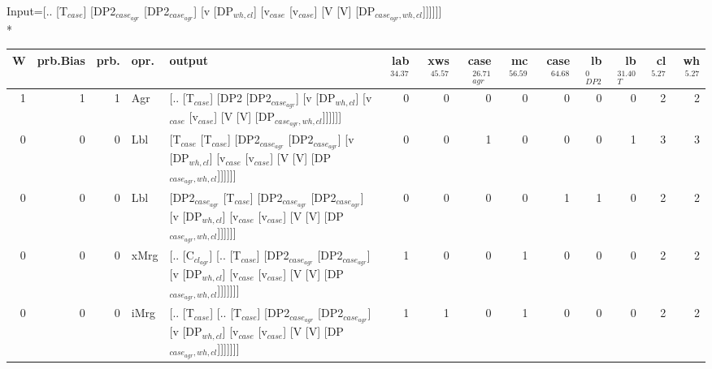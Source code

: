 \begingroup\scriptsize Input=[.. [T$_{case}$] [DP2$_{case_{agr}}$ [DP2$_{case_{agr}}$] [v [DP$_{wh,cl}$] [v$_{case}$ [v$_{case}$] [V [V] [DP$_{case_{agr},wh,cl}$]]]]]]\\*
\begin{tabularx}{\linewidth}{rrrlXrrrrrrrrr}
\hline
   W &   prb.Bias &   prb. & opr.   & output                                                                                                                                                                                                   &   lab$^{34.37}$ &   xws$^{45.57}$ &   case$_{agr}^{26.71}$ &   mc$^{56.59}$ &   case$^{64.68}$ &   lb$_{DP2}^{0}$ &   lb$_{T}^{31.40}$ &   cl$^{5.27}$ &   wh$^{5.27}$ \\
\hline
   1 &       1 &   1 & Agr  & [.. [T$_{case}$] [DP2 [DP2$_{case_{agr}}$] [v [DP$_{wh,cl}$] [v$_{case}$ [v$_{case}$] [V [V] [DP$_{case_{agr},wh,cl}$]]]]]]                                                                                                          &             0 &             0 &                  0 &            0 &              0 &            0 &              0 &        2 &        2 \\
   0 &       0 &   0 & Lbl  & [T$_{case}$ [T$_{case}$] [DP2$_{case_{agr}}$ [DP2$_{case_{agr}}$] [v [DP$_{wh,cl}$] [v$_{case}$ [v$_{case}$] [V [V] [DP$_{case_{agr},wh,cl}$]]]]]]                                                                                             &             0 &             0 &                  1 &            0 &              0 &            0 &              1 &        3 &        3 \\
   0 &       0 &   0 & Lbl  & [DP2$_{case_{agr}}$ [T$_{case}$] [DP2$_{case_{agr}}$ [DP2$_{case_{agr}}$] [v [DP$_{wh,cl}$] [v$_{case}$ [v$_{case}$] [V [V] [DP$_{case_{agr},wh,cl}$]]]]]]                                                                                       &             0 &             0 &                  0 &            0 &              1 &            1 &              0 &        2 &        2 \\
   0 &       0 &   0 & xMrg & [.. [C$_{cl_{agr}}$] [.. [T$_{case}$] [DP2$_{case_{agr}}$ [DP2$_{case_{agr}}$] [v [DP$_{wh,cl}$] [v$_{case}$ [v$_{case}$] [V [V] [DP$_{case_{agr},wh,cl}$]]]]]]]                                                                                 &             1 &             0 &                  0 &            1 &              0 &            0 &              0 &        2 &        2 \\
   0 &       0 &   0 & iMrg & [.. [T$_{case}$] [.. [T$_{case}$] [DP2$_{case_{agr}}$ [DP2$_{case_{agr}}$] [v [DP$_{wh,cl}$] [v$_{case}$ [v$_{case}$] [V [V] [DP$_{case_{agr},wh,cl}$]]]]]]]                                                                                   &             1 &             1 &                  0 &            1 &              0 &            0 &              0 &        2 &        2 \\

\end{tabularx}
